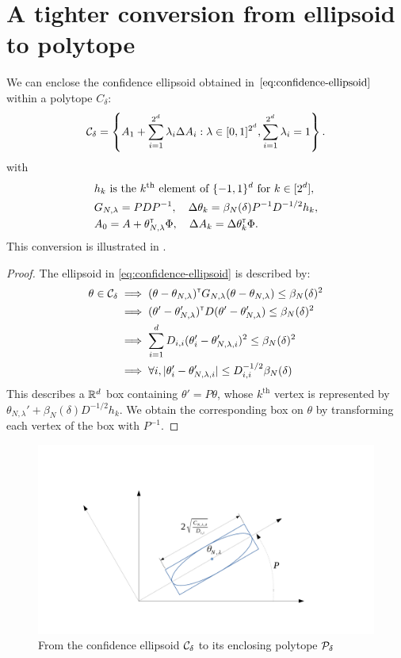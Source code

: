 \documentclass{article}
\begin{document}
\section{A tighter conversion from ellipsoid to polytope}
\label{sec:tight-polytope}
\begin{lemma}
	\label{lem:tight_polytope}
	We can enclose the confidence ellipsoid obtained in $\eqref{eq:confidence-ellipsoid}$ within a polytope $C_\delta$:
	\begin{equation}
	\mathcal{C}_\delta = \left\{ A_{1}+\sum_{i=1}^{2^d}\lambda_{i}\Delta A_{i}: \lambda\in[0, 1]^{2^d},  \sum_{i=1}^{2^d}\lambda_{i}=1\right\}.
	\end{equation}
	with 
	\begin{align*}
	&h_k \text{ is the }k^\text{th}\text{ element of }\{-1,1\}^d\text{ for } k\in[2^d],\\
	&G_{N,\lambda} = PDP^{-1}, \quad \Delta\theta_k = \beta_{N}(\delta)P^{-1}D^{-1/2} h_k, \\
	&A_0 = A + \theta_{N,\lambda}^{\mathsf{\scriptscriptstyle T}}\Phi, \quad \Delta A_k = \Delta\theta_k^{\mathsf{\scriptscriptstyle T}}\Phi.
	\end{align*}
	This conversion is illustrated in .
\end{lemma}

\begin{proof}
	The ellipsoid in \eqref{eq:confidence-ellipsoid} is described by:
	\begin{align*}
	\theta\in\mathcal{C}_\delta &\implies
	(\theta-\theta_{N,\lambda})^{\mathsf{\scriptscriptstyle T}} G_{N,\lambda}(\theta-\theta_{N,\lambda}) \leq \beta_{N}(\delta)^2\\
	&\implies (\theta'-\theta'_{N,\lambda})^{\mathsf{\scriptscriptstyle T}} D (\theta'-\theta'_{N,\lambda}) \leq \beta_{N}(\delta)^2\\
	&\implies \sum_{i=1}^d D_{i,i}(\theta'_i-\theta'_{N,\lambda,i})^2\leq \beta_{N}(\delta)^2\\
	&\implies\forall i, |\theta'_i-\theta'_{N,\lambda,i}|\leq D_{i,i}^{-1/2}\beta_{N}(\delta)
	\end{align*}
	This describes a $\mathbb{R}^d$ box containing $\theta' = P\theta$, whose $k^\text{th}$ vertex is represented by $\theta_{N,\lambda}' + \beta_{N}(\delta)D^{-1/2} h_k$. We obtain the corresponding box on $\theta$ by transforming each vertex of the box with $P^{-1}$.
\end{proof}

\begin{figure}
	\centering
	\includegraphics[trim={3.8cm, 2cm, 5cm, 3.8cm}, clip, width=0.7\linewidth]{img/ellipsoid_to_polytope}
	\caption{From the confidence ellipsoid $\mathcal{C}_\delta$ to its enclosing polytope $\mathcal{P}_\delta$}
	\label{fig:ellipsoid_to_polytope}
\end{figure}
\end{document}
